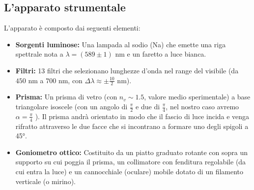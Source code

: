 \documentclass[openany,a4paper,12pt]{book}
\begin{document}
\subsection*{L'apparato strumentale}
L'apparato è composto dai seguenti elementi:
\begin{itemize}
    \item \textbf{Sorgenti luminose:} Una lampada al sodio (Na) che emette una riga spettrale nota a $\lambda = (589 \pm 1) \text{ nm}$ e un faretto a luce bianca.
    \item \textbf{Filtri:} 13 filtri che selezionano lunghezze d'onda nel range del visibile (da $450 \text{ nm}$ a $700 \text{ nm}$, con $\Delta\lambda \approx \pm \frac{10}{2} \text{ nm}$).
    \item \textbf{Prisma:} Un prisma di vetro (con $n_v \sim 1.5$, valore medio sperimentale) a base triangolare isoscele (con un angolo di $\frac{\pi}{2}$ e due di $\frac{\pi}{4}$, nel nostro caso avremo $\alpha = \frac{\pi}{4}$ ). Il prisma andrà orientato in modo che il fascio di luce incida e venga rifratto attraverso le due facce che si incontrano a formare uno degli spigoli a 45°.
    \item \textbf{Goniometro ottico:} Costituito da un piatto graduato rotante con sopra un supporto su cui poggia il prisma, un collimatore con fenditura regolabile (da cui entra la luce) e un cannocchiale (oculare) mobile dotato di un filamento verticale (o mirino).
\end{itemize}
\end{document}
